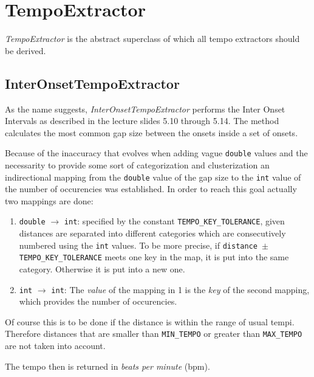 \section{\ttfamily TempoExtractor}
\emph{TempoExtractor} is the abstract superclass of which all tempo extractors
should be derived.

\subsection{\ttfamily InterOnsetTempoExtractor}
As the name suggests, \emph{InterOnsetTempoExtractor} performs the Inter Onset
Intervals as described in the lecture slides 5.10 through 5.14. The method
calculates the most common gap size between the onsets inside a set of onsets. 

Because of the inaccuracy that evolves when adding vague \texttt{double}
values and the necessarity to provide some sort of categorization and
clusterization an indirectional mapping from the \texttt{double} value of the
gap size to the \texttt{int} value of the number of occurencies was established.
In order to reach this goal actually two mappings are done:

\begin{enumerate}
  \item \texttt{double} $\rightarrow$ \texttt{int}: specified by the constant
  \texttt{TEMPO\_KEY\_TOLERANCE}, given distances are separated into different
  categories which are consecutively numbered using the \texttt{int} values. To
  be more precise, if \texttt{distance $\pm$ TEMPO\_KEY\_TOLERANCE}
  meets one key in the map, it is put into the same category. Otherwise it is
  put into a new one.
  \item \texttt{int} $\rightarrow$ \texttt{int}: The \emph{value} of the
  mapping in 1 is the \emph{key} of the second mapping, which provides the
  number of occurencies.
\end{enumerate}

Of course this is to be done if the distance is within the range of usual tempi.
Therefore distances that are smaller than \texttt{MIN\_TEMPO} or greater than
\texttt{MAX\_TEMPO} are not taken into account.

The tempo then is returned in \emph{beats per minute} (bpm).
